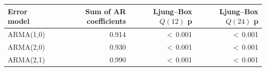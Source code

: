 \begin{tabular}{lrrr}
\toprule
Error model & Sum of AR coefficients & Ljung--Box $Q(12)$ p & Ljung--Box $Q(24)$ p\\
\midrule
ARMA(1,0) & 0.914 & $<$\,0.001 & $<$\,0.001\\
ARMA(2,0) & 0.930 & $<$\,0.001 & $<$\,0.001\\
ARMA(2,1) & 0.990 & $<$\,0.001 & $<$\,0.001\\
\bottomrule
\end{tabular}
